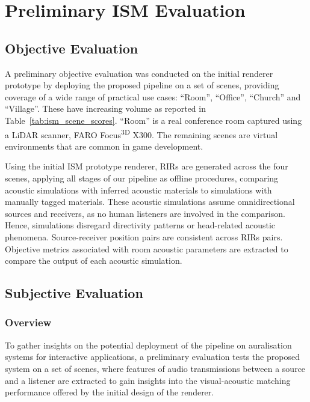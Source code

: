 \section{Preliminary ISM Evaluation}

\subsection{Objective Evaluation}
A preliminary objective evaluation was conducted on the initial renderer prototype by deploying the proposed pipeline on a set of scenes, providing coverage of a wide range of practical use cases: ``Room'', ``Office'', ``Church'' and ``Village''. These have increasing volume as reported in Table~\ref{tab:ism_scene_scores}. ``Room'' is a real conference room captured using a LiDAR scanner, FARO Focus\textsuperscript{3D} X300. The remaining scenes are virtual environments that are common in game development. \par
Using the initial ISM prototype renderer, RIRs are generated across the four scenes, applying all stages of our pipeline as offline procedures, comparing acoustic simulations with inferred acoustic materials to simulations with manually tagged materials. These acoustic simulations assume omnidirectional sources and receivers, as no human listeners are involved in the comparison. Hence, simulations disregard directivity patterns or head-related acoustic phenomena. Source-receiver position pairs are consistent across RIRs pairs. Objective metrics associated with room acoustic parameters are extracted to compare the output of each acoustic simulation.\par

\subsection{Subjective Evaluation}
\subsubsection{Overview}
To gather insights on the potential deployment of the pipeline on auralisation systems for interactive applications, a preliminary evaluation tests the proposed system on a set of scenes, where features of audio transmissions between a source and a listener are extracted to gain insights into the visual-acoustic matching performance offered by the initial design of the renderer. \par

